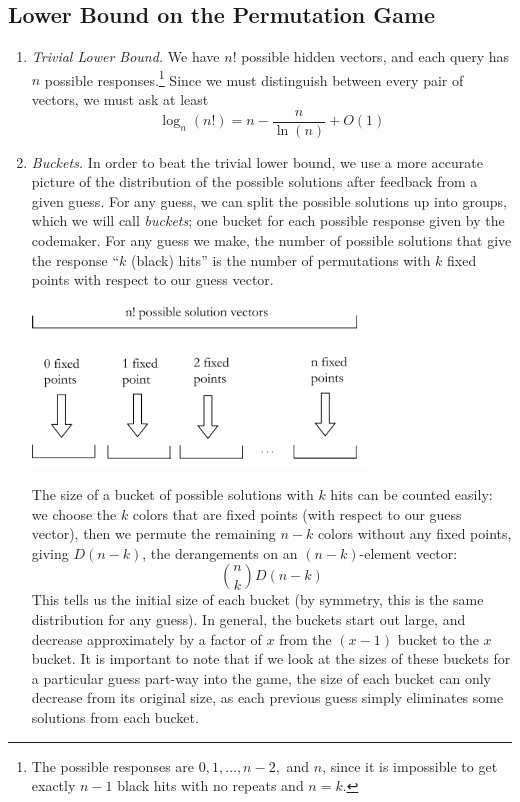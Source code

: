 \documentclass[12pt, a4paper]{article}
\begin{document}
\subsection{Lower Bound on the Permutation Game}
\begin{enumerate}
\item \textit{Trivial Lower Bound.}
	We have $n!$ possible hidden vectors, and each query has $n$ possible
	responses.\footnote{The possible responses are $0, 1, \ldots, n-2,$ and $n$, since it is
	impossible to get exactly $n-1$ black hits with no repeats and $n=k$.}
	Since we must distinguish between every pair of vectors, we must ask at least
		\begin{equation*}
		\log_{n}(n!) = n-\frac{n}{\ln(n)}+O(1)
		\end{equation*}
	
	\item\textit{Buckets.}
	In order to beat the trivial lower bound, we use a more accurate picture
	of the distribution of the possible solutions after feedback from a given guess.
	For any guess, we can split the possible solutions up into groups, which
	we will call \textit{buckets}; one bucket for each possible response given by
	the codemaker. For any guess we make, the number of possible solutions that give
	the response ``$k$ (black) hits'' is the number of permutations with $k$ fixed
	points with respect to our guess vector.
	\begin{center}
	\includegraphics[keepaspectratio=true, width=0.7\textwidth]{buckets.pdf}
	\end{center}
	The size of a bucket of possible
	solutions with $k$ hits can be counted easily: we choose the $k$ colors that are
	fixed points (with respect to our guess vector), then we permute the remaining $n-k$ colors
	without any fixed points, giving $D(n - k)$, the derangements on an $(n-k)$-element
	vector:
		\begin{equation*}
		\binom{n}{k}D(n-k)
		\end{equation*}
	This tells us the initial size of each bucket (by symmetry, this is the same distribution
	for any guess). In general, the buckets start out large,
	and decrease approximately by a factor of $x$ from the $(x-1)$ bucket to the
	$x$ bucket. It is important to note that if we look at the sizes of these buckets for
	a particular guess
	part-way into the game, the size of each bucket can only decrease from its original size,
	as each previous guess simply eliminates some solutions from each bucket.
	

\end{enumerate}
\end{document}
